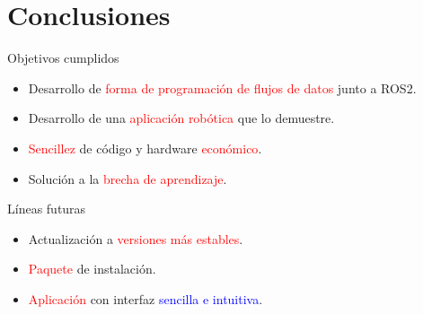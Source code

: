 \documentclass{beamer}
\begin{document}
\section{Conclusiones}
\begin{frame}
\begin{block}{Objetivos cumplidos}
\begin{itemize}
\item Desarrollo de \textcolor{red}{forma de programación de flujos de datos} junto a ROS2.
\item Desarrollo de una \textcolor{red}{aplicación robótica} que lo demuestre.
\item \textcolor{red}{Sencillez} de código y hardware \textcolor{red}{económico}.
\item Solución a la \textcolor{red}{brecha de aprendizaje}.
\end{itemize}
\end{block}

\begin{block}{Líneas futuras}
\begin{itemize}
\item Actualización a \textcolor{red}{versiones más estables}.
\item \textcolor{red}{Paquete} de instalación.
\item \textcolor{red}{Aplicación} con interfaz \textcolor{blue}{sencilla e intuitiva}.
\end{itemize}
\end{block}
\end{frame}

\begin{frame}[plain]
\large{\titlepage}
\end{frame}
\end{document}

